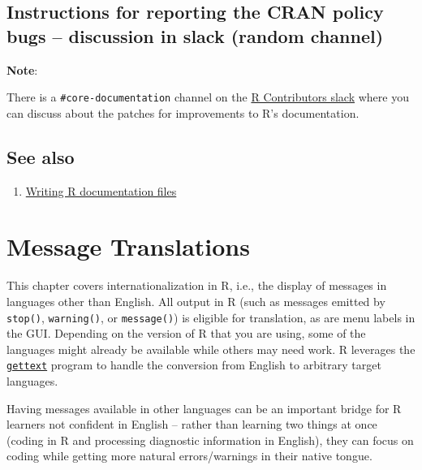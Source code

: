 \documentclass[
]{book}
\providecommand{\tightlist}{%
  \setlength{\itemsep}{0pt}\setlength{\parskip}{0pt}}
\begin{document}
\hypertarget{instructions-for-reporting-the-cran-policy-bugs-discussion-in-slack-random-channel}{%
\section{Instructions for reporting the CRAN policy bugs -- discussion in slack (random channel)}\label{instructions-for-reporting-the-cran-policy-bugs-discussion-in-slack-random-channel}}

\textbf{Note}:

There is a \texttt{\#core-documentation} channel on the \href{https://r-contributors.slack.com/}{R Contributors slack} where you can discuss about the patches for improvements to R's documentation.

\hypertarget{see-also-5}{%
\section{See also}\label{see-also-5}}

\begin{enumerate}
\def\labelenumi{\arabic{enumi}.}
\tightlist
\item
  \href{https://cran.r-project.org/doc/manuals/r-release/R-exts.html\#Writing-R-documentation-files}{Writing R documentation files}
\end{enumerate}

\hypertarget{message-translations}{%
\chapter{Message Translations}\label{message-translations}}

This chapter covers internationalization in R, i.e., the display of messages in languages other than English. All
output in R (such as messages emitted by \texttt{stop()}, \texttt{warning()}, or \texttt{message()}) is eligible for translation, as
are menu labels in the GUI. Depending on the version of R that you are using, some of the languages might already
be available while others may need work. R leverages the \href{https://www.gnu.org/software/gettext/}{\texttt{gettext}} program
to handle the conversion from English to arbitrary target languages.

Having messages available in other languages can be an important bridge for R learners not confident in English --
rather than learning two things at once (coding in R and processing diagnostic information in English), they can
focus on coding while getting more natural errors/warnings in their native tongue.
\end{document}
